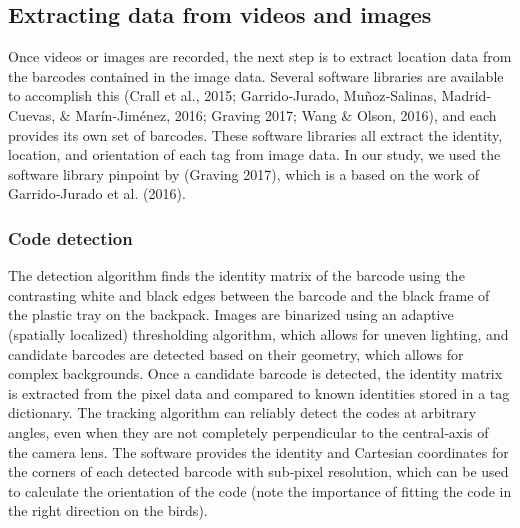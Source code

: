 \documentclass[11pt,a4paper,oneside]{book}
\begin{document}
\begin{doublespace}
\subsection{Extracting data from videos and images}
Once videos or images are recorded, the next step is to extract location data from the barcodes contained in the image data. Several software libraries are available to accomplish this (Crall et al., 2015; Garrido‐Jurado, Muñoz‐Salinas, Madrid‐Cuevas, \& Marín‐Jiménez, 2016; Graving 2017; Wang & Olson, 2016), and each provides its own set of barcodes. These software libraries all extract the identity, location, and orientation of each tag from image data. In our study, we used the software library pinpoint by (Graving 2017), which is a based on the work of Garrido‐Jurado et al. (2016).

\subsubsection{Code detection}
The detection algorithm finds the identity matrix of the barcode using the contrasting white and black edges between the barcode and the black frame of the plastic tray on the backpack. Images are binarized using an adaptive (spatially localized) thresholding algorithm, which allows for uneven lighting, and candidate barcodes are detected based on their geometry, which allows for complex backgrounds. Once a candidate barcode is detected, the identity matrix is extracted from the pixel data and compared to known identities stored in a tag dictionary. The tracking algorithm can reliably detect the codes at arbitrary angles, even when they are not completely perpendicular to the central‐axis of the camera lens. The software provides the identity and Cartesian coordinates for the corners of each detected barcode with sub‐pixel resolution, which can be used to calculate the orientation of the code (note the importance of fitting the code in the right direction on the birds).


\end{doublespace}
\end{document}
